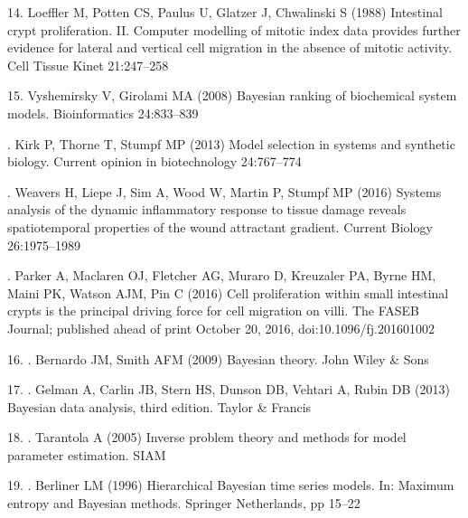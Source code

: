 \documentclass[10pt,letterpaper]{article}
\providecommand{\DIFaddtex}[1]{{\protect\color{blue} \sf #1}} %
\providecommand{\DIFdeltex}[1]{{\protect\color{red} \scriptsize #1}} %
\providecommand{\DIFaddbegin}{} %
\providecommand{\DIFaddend}{} %
\providecommand{\DIFdelbegin}{} %
\providecommand{\DIFdelend}{} %
\providecommand{\DIFadd}[1]{\texorpdfstring{\DIFaddtex{#1}}{#1}} %
\providecommand{\DIFdel}[1]{\texorpdfstring{\DIFdeltex{#1}}{}} %
\begin{document}
\hypertarget{ref-Loeffler1988-zb}{}
14. Loeffler M, Potten CS, Paulus U, Glatzer J, Chwalinski S (1988)
Intestinal crypt proliferation. II. Computer modelling of mitotic index
data provides further evidence for lateral and vertical cell migration
in the absence of mitotic activity. Cell Tissue Kinet 21:247--258

\DIFdelbegin %
\DIFdelend \DIFaddbegin \hypertarget{ref-Vyshemirsky2008-gh}{}
\DIFaddend 15. \DIFaddbegin \DIFadd{Vyshemirsky V, Girolami MA (2008) Bayesian ranking of biochemical
system models. Bioinformatics 24:833--839
}

\hypertarget{ref-Kirk2013-cd}{}
\DIFadd{16. Kirk P, Thorne T, Stumpf MP (2013) Model selection in systems and
synthetic biology. Current opinion in biotechnology 24:767--774
}

\hypertarget{ref-Weavers2016-ab}{}
\DIFadd{17. Weavers H, Liepe J, Sim A, Wood W, Martin P, Stumpf MP (2016)
Systems analysis of the dynamic inflammatory response to tissue damage
reveals spatiotemporal properties of the wound attractant gradient.
Current Biology 26:1975--1989
}

\hypertarget{ref-Parker2016-jf}{}
\DIFadd{18. }\DIFaddend Parker A, Maclaren OJ, Fletcher AG, Muraro D, Kreuzaler PA, Byrne
HM, Maini PK, Watson AJM, Pin C (2016) Cell proliferation within small
intestinal crypts is the principal driving force for cell migration on
villi. The FASEB Journal; published ahead of print October 20, 2016,
doi:10.1096/fj.201601002

\hypertarget{ref-Bernardo2009-uw}{}
\DIFdelbegin \DIFdel{16. }\DIFdelend \DIFaddbegin \DIFadd{19. }\DIFaddend Bernardo JM, Smith AFM (2009) Bayesian theory. John Wiley \& Sons

\hypertarget{ref-Gelman2013-id}{}
\DIFdelbegin \DIFdel{17. }\DIFdelend \DIFaddbegin \DIFadd{20. }\DIFaddend Gelman A, Carlin JB, Stern HS, Dunson DB, Vehtari A, Rubin DB (2013)
Bayesian data analysis, third edition. Taylor \& Francis

\hypertarget{ref-Tarantola2005-sv}{}
\DIFdelbegin \DIFdel{18. }\DIFdelend \DIFaddbegin \DIFadd{21. }\DIFaddend Tarantola A (2005) Inverse problem theory and methods for model
parameter estimation. SIAM

\hypertarget{ref-Berliner1996-xr}{}
\DIFdelbegin \DIFdel{19. }\DIFdelend \DIFaddbegin \DIFadd{22. }\DIFaddend Berliner LM (1996) Hierarchical Bayesian time series models. In:
Maximum entropy and Bayesian methods. Springer Netherlands, pp 15--22
\end{document}
